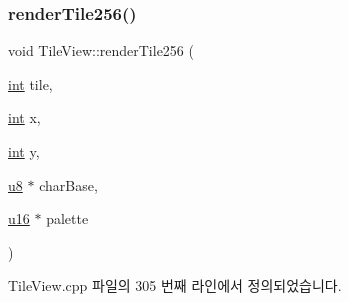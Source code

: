 \subsubsection{\texorpdfstring{render\+Tile256()}{renderTile256()}}
{\footnotesize\ttfamily void Tile\+View\+::render\+Tile256 (\begin{DoxyParamCaption}\item[{\mbox{\hyperlink{_util_8cpp_a0ef32aa8672df19503a49fab2d0c8071}{int}}}]{tile,  }\item[{\mbox{\hyperlink{_util_8cpp_a0ef32aa8672df19503a49fab2d0c8071}{int}}}]{x,  }\item[{\mbox{\hyperlink{_util_8cpp_a0ef32aa8672df19503a49fab2d0c8071}{int}}}]{y,  }\item[{\mbox{\hyperlink{_system_8h_aed742c436da53c1080638ce6ef7d13de}{u8}} $\ast$}]{char\+Base,  }\item[{\mbox{\hyperlink{_system_8h_a9e6c91d77e24643b888dbd1a1a590054}{u16}} $\ast$}]{palette }\end{DoxyParamCaption})}



Tile\+View.\+cpp 파일의 305 번째 라인에서 정의되었습니다.


